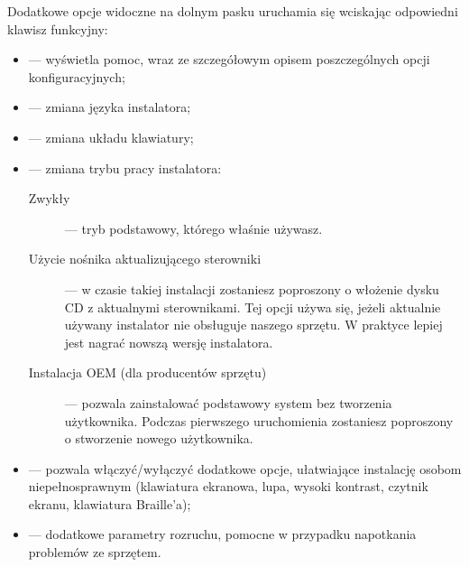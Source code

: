 Dodatkowe opcje widoczne na dolnym pasku uruchamia się wciskając odpowiedni klawisz funkcyjny:
\begin{itemize}
\item {} --- wyświetla pomoc, wraz ze szczegółowym opisem poszczególnych opcji konfiguracyjnych;
\item {} --- zmiana języka instalatora;
\item {} --- zmiana układu klawiatury;
\item {} --- zmiana trybu pracy instalatora:
        \begin{description}
        \item[\textcolor{ubuntu_orange}{Zwykły}] --- tryb podstawowy, którego właśnie używasz.
        \item[\textcolor{ubuntu_orange}{Użycie nośnika aktualizującego sterowniki}] --- w czasie takiej instalacji zostaniesz poproszony o włożenie dysku CD z aktualnymi sterownikami. Tej opcji używa się, jeżeli aktualnie używany instalator nie obsługuje naszego sprzętu. W praktyce lepiej jest nagrać nowszą wersję instalatora.
        \item[\textcolor{ubuntu_orange}{Instalacja OEM (dla producentów sprzętu)}] --- pozwala zainstalować podstawowy system bez tworzenia użytkownika. Podczas pierwszego uruchomienia zostaniesz poproszony o stworzenie nowego użytkownika.
        \end{description}
\item {} --- pozwala włączyć/wyłączyć dodatkowe opcje, ułatwiające instalację osobom niepełnosprawnym (klawiatura ekranowa, lupa, wysoki kontrast, czytnik ekranu, klawiatura Braille'a);
\item {} --- dodatkowe parametry rozruchu, pomocne w przypadku napotkania problemów ze sprzętem.
\end{itemize}
